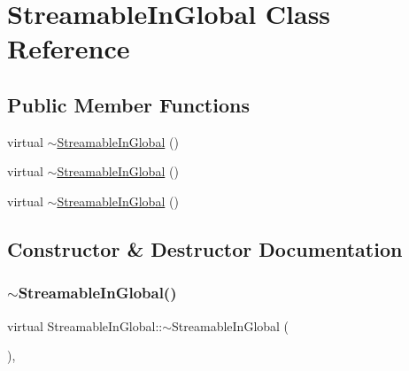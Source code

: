 \hypertarget{class_streamable_in_global}{}\section{Streamable\+In\+Global Class Reference}
\label{class_streamable_in_global}
\subsection*{Public Member Functions}
\begin{DoxyCompactItemize}
\item 
virtual \mbox{\hyperlink{class_streamable_in_global_a20cd7676e22a7a8bbad17c42681d46bf}{$\sim$\+Streamable\+In\+Global}} ()
\item 
virtual \mbox{\hyperlink{class_streamable_in_global_a20cd7676e22a7a8bbad17c42681d46bf}{$\sim$\+Streamable\+In\+Global}} ()
\item 
virtual \mbox{\hyperlink{class_streamable_in_global_a20cd7676e22a7a8bbad17c42681d46bf}{$\sim$\+Streamable\+In\+Global}} ()
\end{DoxyCompactItemize}


\subsection{Constructor \& Destructor Documentation}
\mbox{\label{class_streamable_in_global_a20cd7676e22a7a8bbad17c42681d46bf}} 
\subsubsection{\texorpdfstring{$\sim$StreamableInGlobal()}{~StreamableInGlobal()}\hspace{0.1cm}{\footnotesize\ttfamily [1/3]}}
{\footnotesize\ttfamily virtual Streamable\+In\+Global\+::$\sim$\+Streamable\+In\+Global (\begin{DoxyParamCaption}{ }\end{DoxyParamCaption})\hspace{0.3cm}{\ttfamily [inline]}, {\ttfamily [virtual]}}

\mbox{\label{class_streamable_in_global_a20cd7676e22a7a8bbad17c42681d46bf}} 
